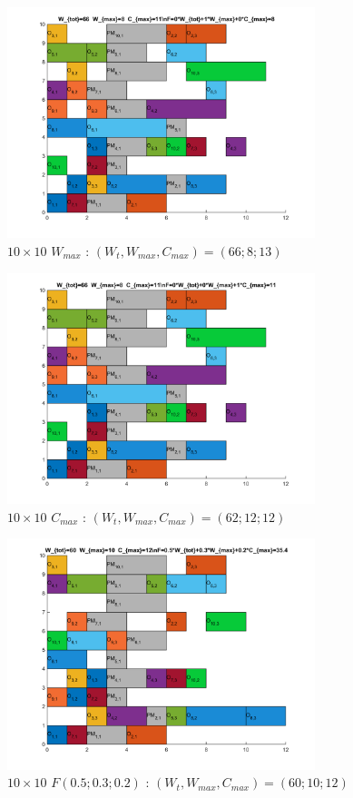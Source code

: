 \documentclass[10pt,a4paper]{scrartcl}
\begin{document}
\begin{figure}
  \centering
  \includegraphics[width=0.8\textwidth]{img/results10x10_Wmax.png}
  \caption{$10 \times 10$ $W_{max}$ : $(W_t, W_{max}, C_{max}) = (66; 8; 13)$}
\end{figure}
\begin{figure}
  \centering
  \includegraphics[width=0.8\textwidth]{img/results10x10_Cmax.png}
  \caption{$10 \times 10$ $C_{max}$ : $(W_t, W_{max}, C_{max}) = (62; 12; 12)$}
\end{figure}
\begin{figure}
  \centering
  \includegraphics[width=0.8\textwidth]{img/results10x10_F050302.png}
  \caption{$10 \times 10$ $F(0.5;0.3;0.2)$ : $(W_t, W_{max}, C_{max}) = (60; 10; 12)$}
\end{figure}
\end{document}
